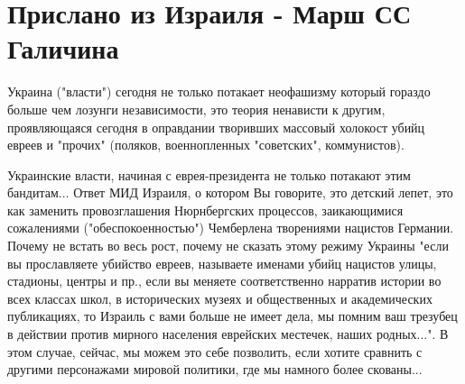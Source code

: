  
 
 
 
 
\section{Прислано из Израиля - Марш СС Галичина}

Украина ("власти") сегодня не только потакает неофашизму который гораздо больше
чем лозунги независимости, это теория ненависти к другим, проявляющаяся сегодня
в оправдании творивших массовый холокост убийц евреев и "прочих" (поляков,
военнопленных "советских", коммунистов).

Украинские власти, начиная с еврея-президента не только потакают этим
бандитам... Ответ МИД Израиля, о котором Вы говорите, это детский лепет, это
как заменить провозглашения Нюрнбергских процессов, заикающимися сожалениями
("обеспокоенностью") Чемберлена творениями нацистов Германии.  Почему не встать
во весь рост, почему не сказать этому режиму Украины "если вы прославляете
убийство евреев, называете именами убийц нацистов улицы, стадионы, центры и
пр., если вы меняете соответственно нарратив истории во всех классах школ, в
исторических музеях и общественных и академических публикациях, то Израиль с
вами больше не имеет дела, мы помним ваш трезубец в действии против мирного
населения еврейских местечек, наших родных...".  В этом случае, сейчас, мы
можем это себе позволить, если хотите сравнить с другими персонажами мировой
политики, где мы намного более скованы...
